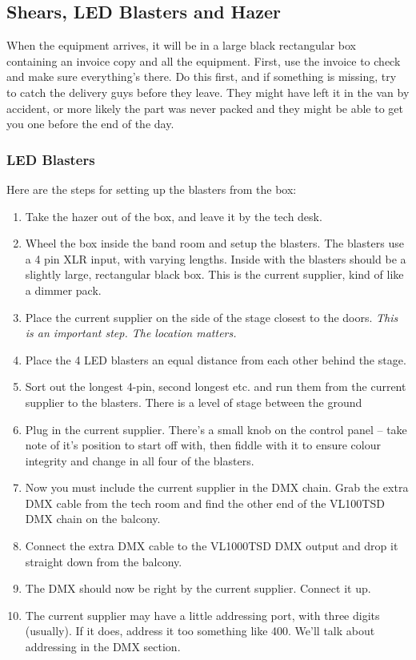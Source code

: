 \documentclass[letterpaper,10pt,oneside,headsepline]{scrreprt}
\begin{document}
\subsection{Shears, LED Blasters and Hazer}
When the equipment arrives, it will be in a large black rectangular box containing an invoice copy and all the equipment. First, use the invoice to check and make sure everything's there. Do this first, and if something is missing, try to catch the delivery guys before they leave. They might have left it in the van by accident, or more likely the part was never packed and they might be able to get you one before the end of the day.
\subsubsection{LED Blasters}
Here are the steps for setting up the blasters from the box:
\begin{enumerate}
\item Take the hazer out of the box, and leave it by the tech desk.
\item Wheel the box inside the band room and setup the blasters. The blasters use a 4 pin XLR input, with varying lengths. Inside with the blasters should be a slightly large, rectangular black box. This is the current supplier, kind of like a dimmer pack.
\item Place the current supplier on the side of the stage closest to the doors. \textit{This is an important step. The location matters.}
\item Place the 4 LED blasters an equal distance from each other behind the stage. 
\item Sort out the longest 4-pin, second longest etc. and run them from the current supplier to the blasters. There is a level of stage between the ground

\item Plug in the current supplier. There's a small knob on the control panel -- take note of it's position to start off with, then fiddle with it to ensure colour integrity and change in all four of the blasters. 
\item Now you must include the current supplier in the DMX chain. Grab the extra DMX cable from the tech room and find the other end of the VL100TSD DMX chain on the balcony.
\item Connect the extra DMX cable to the VL1000TSD DMX output and drop it straight down from the balcony.
\item The DMX should now be right by the current supplier. Connect it up.
\item The current supplier may have a little addressing port, with three digits (usually). If it does, address it too something like 400. We'll talk about addressing in the DMX section.
\end{enumerate}
\end{document}
